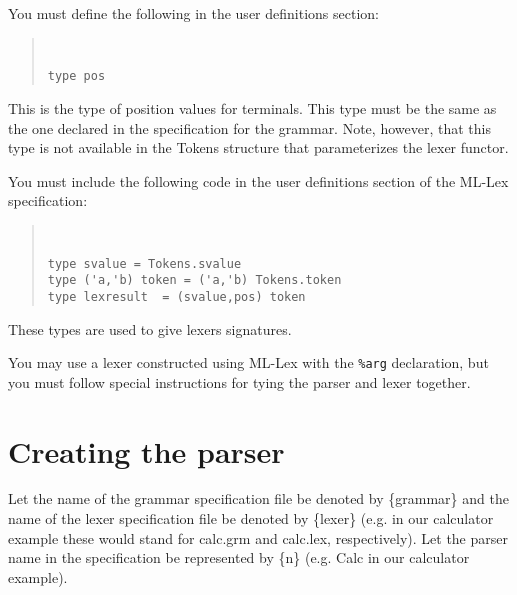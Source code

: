 You must define the following in the user definitions section:
\begin{quote}
\tt
\begin{verbatim}
type pos
\end{verbatim}
\end{quote}
This is the type of position values for terminals.  This type
must be the same as the one declared in the specification for
the grammar.  Note, however, that this type is not available
in the Tokens structure that parameterizes the lexer functor.

You must include the following code in the user definitions section of
the ML-Lex specification:
\begin{quote}
\tt
\begin{verbatim}
type svalue = Tokens.svalue
type ('a,'b) token = ('a,'b) Tokens.token
type lexresult  = (svalue,pos) token
\end{verbatim}
\end{quote}

These types are used to give lexers signatures.

You may use a lexer constructed using ML-Lex with the {\tt \%arg}
declaration, but you must follow special instructions for tying the parser
and lexer together.
 
\section{Creating the parser}
\label{create-parser}
Let the name of the grammar specification file be denoted by
\{grammar\} and the name of the lexer specification file be
denoted by \{lexer\} (e.g. in our calculator example these would
stand for calc.grm and calc.lex, respectively).
Let the parser name in the specification be represented by \{n\}
(e.g. Calc in our calculator example).

